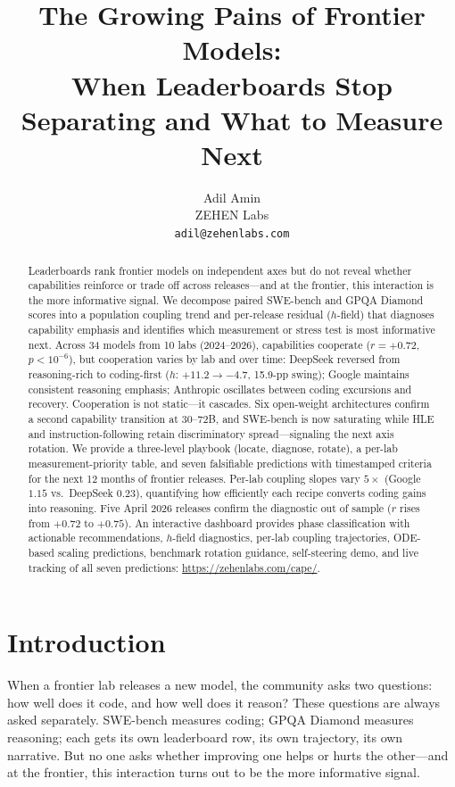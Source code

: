 \documentclass{article}
\title{The Growing Pains of Frontier Models:\\When Leaderboards Stop Separating and What to Measure Next}
\author{Adil Amin\\ZEHEN Labs\\{\tt adil@zehenlabs.com}}
\begin{document}
\maketitle

\begin{abstract}
Leaderboards rank frontier models on independent axes but do not reveal
whether capabilities reinforce or trade off across releases---and
at the frontier, this interaction is the more informative signal.
We decompose paired SWE-bench and GPQA Diamond scores into
a population coupling trend and per-release residual ($h$-field) that
diagnoses capability emphasis and identifies which measurement
or stress test is most informative next.
Across 34 models from 10 labs (2024--2026), capabilities cooperate
($r = +0.72$, $p < 10^{-6}$), but cooperation varies by lab and over time:
DeepSeek reversed from reasoning-rich to coding-first
($h$: $+11.2 \to -4.7$, 15.9-pp swing);
Google maintains consistent reasoning emphasis;
Anthropic oscillates between coding excursions and recovery.
Cooperation is not static---it cascades.
Six open-weight architectures confirm a second capability transition
at 30--72B, and SWE-bench is now saturating while HLE and
instruction-following retain discriminatory spread---signaling
the next axis rotation.
We provide a three-level playbook (locate, diagnose, rotate),
a per-lab measurement-priority table, and seven falsifiable predictions
with timestamped criteria for the next 12 months of frontier releases.
Per-lab coupling slopes vary $5\times$ (Google $1.15$ vs.\ DeepSeek $0.23$),
quantifying how efficiently each recipe converts coding gains into reasoning.
Five April 2026 releases confirm the diagnostic out of sample
($r$ rises from $+0.72$ to $+0.75$).
An interactive dashboard provides phase classification
with actionable recommendations, $h$-field diagnostics,
per-lab coupling trajectories, ODE-based scaling predictions,
benchmark rotation guidance, self-steering demo,
and live tracking of all seven predictions:
\url{https://zehenlabs.com/cape/}.
\end{abstract}

\section{Introduction}
\label{sec:intro}

When a frontier lab releases a new model, the community asks two questions:
how well does it code, and how well does it reason?
These questions are always asked separately.
SWE-bench measures coding; GPQA Diamond measures reasoning;
each gets its own leaderboard row, its own trajectory, its own narrative.
But no one asks whether improving one helps or hurts the other---and
at the frontier, this interaction turns out to be the more informative signal.
\end{document}
